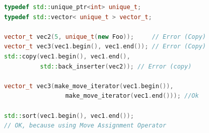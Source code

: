 \documentclass[a4paper,12pt,twoside]{book}
\begin{document}
\begin{itemize}
\begin{lstlisting}[frame=single, language=c++]
typedef std::unique_ptr<int> unique_t;
typedef std::vector< unique_t > vector_t;

vector_t vec2(5, unique_t(new Foo));     // Error (Copy)
vector_t vec3(vec1.begin(), vec1.end()); // Error (Copy)
std::copy(vec1.begin(), vec1.end(),
          std::back_inserter(vec2)); // Error (copy)

vector_t vec3(make_move_iterator(vec1.begin()),
                 make_move_iterator(vec1.end())); //Ok

std::sort(vec1.begin(), vec1.end());
// OK, because using Move Assignment Operator
\end{lstlisting}


\end{itemize}
\end{document}
